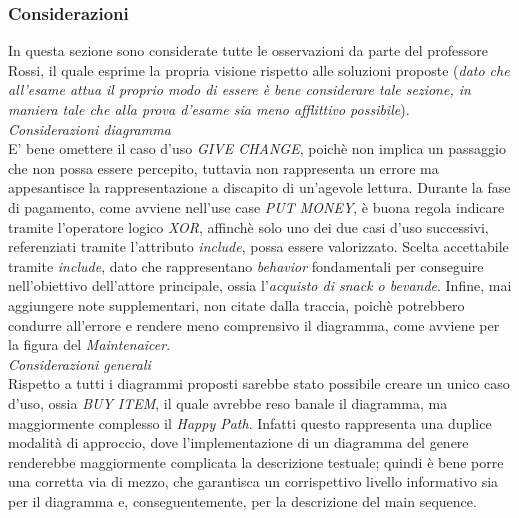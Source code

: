 \documentclass{article}
\begin{document}
\subsubsection*{Considerazioni}
\large
In questa sezione sono considerate tutte le osservazioni da parte del professore Rossi, il quale esprime la propria visione rispetto
alle soluzioni proposte (\textit{dato che all'esame attua il proprio modo di essere è bene considerare tale sezione, in maniera tale che alla prova d'esame sia meno afflittivo possibile}).\vspace*{14pt}\\
\textit{Considerazioni diagramma}\\
E' bene omettere il caso d'uso \textit{GIVE CHANGE}, poichè non implica un passaggio che non possa essere percepito, tuttavia non rappresenta un errore ma appesantisce la rappresentazione a discapito di un'agevole lettura.
Durante la fase di pagamento, come avviene nell'use case \textit{PUT MONEY}, è buona regola indicare tramite l'operatore logico \textit{XOR}, affinchè solo uno dei due casi d'uso successivi, referenziati tramite l'attributo \textit{include}, possa essere valorizzato.
Scelta accettabile tramite \textit{include}, dato che rappresentano \textit{behavior} fondamentali per conseguire nell'obiettivo dell'attore principale, ossia l'\textit{acquisto di snack o bevande}. Infine, mai aggiungere note supplementari, non citate dalla traccia, poichè potrebbero condurre all'errore e rendere meno comprensivo il diagramma, come avviene per la figura del \textit{Maintenaicer}.\vspace{14pt}\\
\textit{Considerazioni generali}\\
Rispetto a tutti i diagrammi proposti sarebbe stato possibile creare un unico caso d'uso, ossia \textit{BUY ITEM}, il quale avrebbe reso banale il diagramma, ma maggiormente complesso il \textit{Happy Path}. Infatti questo rappresenta una duplice modalità di approccio, dove l'implementazione di un diagramma del genere renderebbe maggiormente complicata la descrizione testuale; quindi è bene porre una corretta via di mezzo, che garantisca un corrispettivo livello informativo sia per il diagramma e, conseguentemente, per la descrizione del main sequence.
\end{document}
